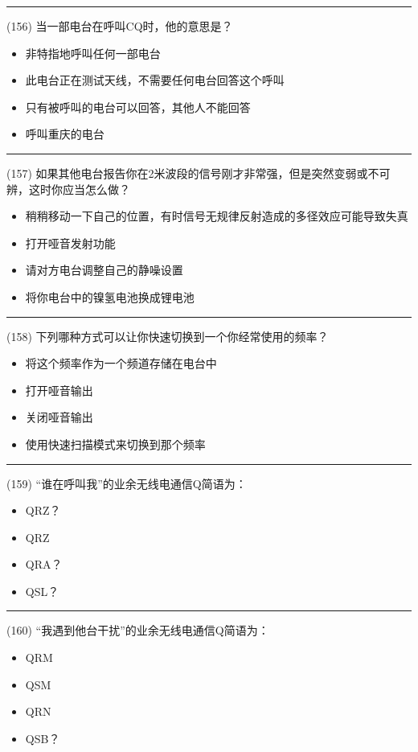 \documentclass[twocolumn]{ctexart}  %
\begin{document}
\noindent\rule{0.5\textwidth}{1pt}
\heiti (156) 当一部电台在呼叫CQ时，他的意思是？ \songti {\color{gray} [LK1098] }
\begin{itemize}
	\item  非特指地呼叫任何一部电台
	\item  此电台正在测试天线，不需要任何电台回答这个呼叫
	\item  只有被呼叫的电台可以回答，其他人不能回答
	\item  呼叫重庆的电台
\end{itemize}


\noindent\rule{0.5\textwidth}{1pt}
\heiti (157) 如果其他电台报告你在2米波段的信号刚才非常强，但是突然变弱或不可辨，这时你应当怎么做？ \songti {\color{gray} [LK1102] }
\begin{itemize}
	\item  稍稍移动一下自己的位置，有时信号无规律反射造成的多径效应可能导致失真
	\item  打开哑音发射功能
	\item  请对方电台调整自己的静噪设置
	\item  将你电台中的镍氢电池换成锂电池
\end{itemize}


\noindent\rule{0.5\textwidth}{1pt}
\heiti (158) 下列哪种方式可以让你快速切换到一个你经常使用的频率？ \songti {\color{gray} [LK1131] }
\begin{itemize}
	\item  将这个频率作为一个频道存储在电台中
	\item  打开哑音输出
	\item  关闭哑音输出
	\item  使用快速扫描模式来切换到那个频率
\end{itemize}


\noindent\rule{0.5\textwidth}{1pt}
\heiti (159) “谁在呼叫我”的业余无线电通信Q简语为： \songti {\color{gray} [LK0287] }
\begin{itemize}
	\item  QRZ？
	\item  QRZ
	\item  QRA？
	\item  QSL？
\end{itemize}


\noindent\rule{0.5\textwidth}{1pt}
\heiti (160) “我遇到他台干扰”的业余无线电通信Q简语为： \songti {\color{gray} [LK0292] }
\begin{itemize}
	\item  QRM
	\item  QSM
	\item  QRN
	\item  QSB？
\end{itemize}
\end{document}

